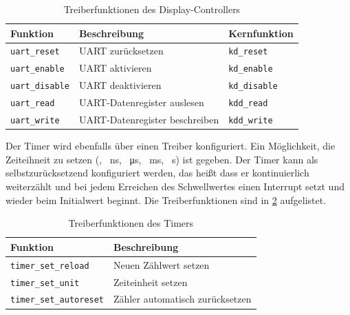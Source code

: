 \begin{table}[!htbp]
	\bigskip
	\centering
	\begin{tabular}{ l | l | l}
		\textbf{Funktion} & \textbf{Beschreibung} & \textbf{Kernfunktion} \\
		\hline		
		\texttt{uart\_reset} & UART zurücksetzen & \texttt{kd\_reset} \\
		\texttt{uart\_enable} & UART aktivieren & \texttt{kd\_enable} \\
		\texttt{uart\_disable} & UART deaktivieren & \texttt{kd\_disable}\\
		\texttt{uart\_read} & UART-Datenregister auslesen & \texttt{kdd\_read}\\
		\texttt{uart\_write} & UART-Datenregister beschreiben & \texttt{kdd\_write}\\
		\hline
	\end{tabular}
	
	\caption{Treiberfunktionen des Display-Controllers}
	\label{tab:drv_uart_func}
\end{table}



Der Timer wird ebenfalls über einen Treiber konfiguriert. Ein Möglichkeit, die Zeiteihneit zu setzen (\SI{}{\tick}, \SI{}{\nano\second}, \SI{}{\micro\second}, \SI{}{\milli\second}, \SI{}{\second}) ist gegeben. Der Timer kann als selbstzurücksetzend konfiguriert werden, das heißt dass er kontinuierlich weiterzählt und bei jedem Erreichen des Schwellwertes einen Interrupt setzt und wieder beim Initialwert beginnt. Die Treiberfunktionen sind in \cref{tab:drv_timer_func} aufgelistet.

\begin{table}[!htbp]
	\bigskip
	\centering
	\begin{tabular}{ l | l }
		\textbf{Funktion} & \textbf{Beschreibung} \\
		\hline		
		\texttt{timer\_set\_reload} & Neuen Zählwert setzen \\
		\texttt{timer\_set\_unit} & Zeiteinheit setzen \\
		\texttt{timer\_set\_autoreset} & Zähler automatisch zurücksetzen \\
		\hline
	\end{tabular}
	
	\caption{Treiberfunktionen des Timers}
	\label{tab:drv_timer_func}
\end{table}


